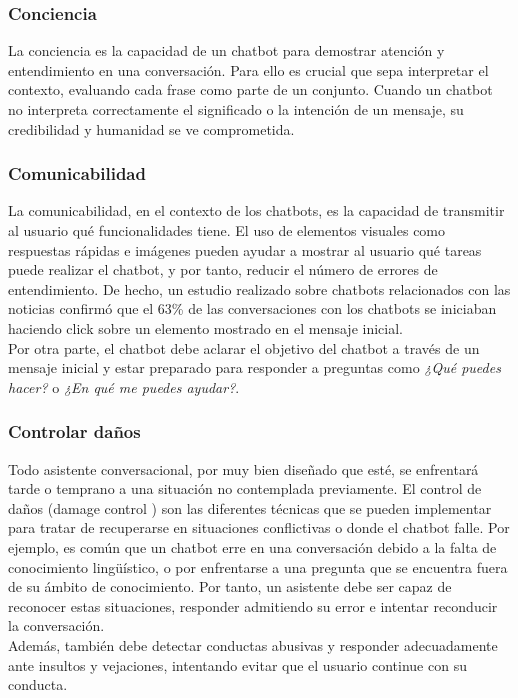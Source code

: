 \subsubsection{Conciencia}
La conciencia es la capacidad de un chatbot para demostrar atención y entendimiento en una conversación. Para ello es crucial que sepa interpretar el contexto, evaluando cada frase como parte de un conjunto. Cuando un chatbot no interpreta correctamente el significado o la intención de un mensaje, su credibilidad y humanidad se ve comprometida. 


\subsubsection{Comunicabilidad}
La comunicabilidad, en el contexto de los chatbots, es la capacidad de transmitir al usuario qué funcionalidades tiene. El uso de elementos visuales como respuestas rápidas e imágenes  pueden ayudar a mostrar al usuario qué tareas puede realizar el chatbot, y por tanto, reducir el número de errores de entendimiento. De hecho, un estudio realizado sobre chatbots relacionados con las noticias confirmó que el 63\% de las conversaciones con los chatbots se iniciaban haciendo click sobre un elemento mostrado en el mensaje inicial.\\

Por otra parte, el chatbot debe aclarar el objetivo del chatbot a través de un mensaje inicial y estar preparado para responder a preguntas como \textit{¿Qué puedes hacer?} o \textit{¿En qué me puedes ayudar?}.\\

\subsubsection{Controlar daños}
Todo asistente conversacional, por muy bien diseñado que esté, se enfrentará tarde o temprano a una situación no contemplada previamente. El control de daños (damage control ) son las diferentes técnicas que se pueden implementar para tratar de recuperarse en situaciones conflictivas o donde el chatbot falle. Por ejemplo, es común que un chatbot erre en una conversación debido a la falta de conocimiento lingüístico, o por enfrentarse a una pregunta que se encuentra fuera de su ámbito de conocimiento. Por tanto, un asistente debe ser capaz de reconocer estas situaciones, responder admitiendo su error e intentar reconducir la conversación.\\

Además, también debe detectar conductas abusivas y responder adecuadamente ante insultos y vejaciones, intentando evitar que el usuario continue con su conducta.\\ 

